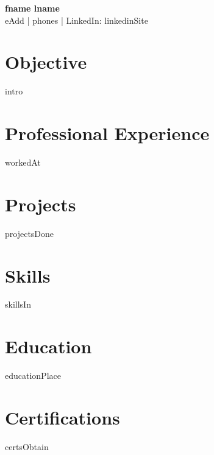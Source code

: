\documentclass[a4paper,10pt]{article}
\begin{document}
\pagestyle{empty}

\begin{center}
    \textbf{\LARGE {fname} {lname}} \\
    {eAdd} | {phones} | LinkedIn: {linkedinSite}
\end{center}

\section*{Objective}
{intro}

\section*{Professional Experience}
{workedAt}

\section*{Projects}
{projectsDone}

\section*{Skills}
{skillsIn}

\section*{Education}
{educationPlace}

\section*{Certifications}
{certsObtain}
\end{document}
